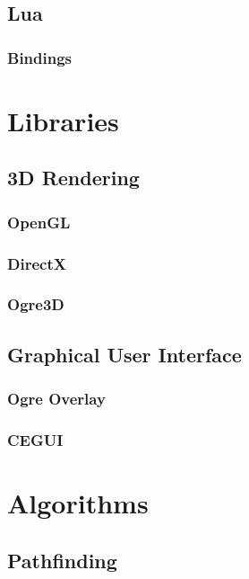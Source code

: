 \subsection{Lua}

\subsubsection{Bindings}

\section{Libraries}

\subsection{3D Rendering}

\subsubsection{OpenGL}

\subsubsection{DirectX}

\subsubsection{Ogre3D}

\subsection{Graphical User Interface}

\subsubsection{Ogre Overlay}

\subsubsection{CEGUI}

\section{Algorithms}


\subsection{Pathfinding}

